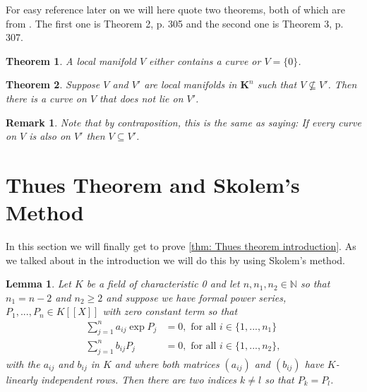 \documentclass{article}
\newtheorem{theorem}{Theorem}[section]
\newtheorem{lemma}{Lemma}[section]
\newtheorem{remark}{Remark}[section]
\newcommand{\mbb}[1]{\mathbb{#1}}
\numberwithin{equation}{section}
\begin{document}
%


For easy reference later on we will here quote two theorems, both of which are from \citep{borevich}. The first one is Theorem 2, p. 305 and the second one is Theorem 3, p. 307.

\begin{theorem}\label{thm: The shape of a manifold}
	A local manifold $V$ either contains a curve or $V = \{ 0 \}$.
\end{theorem}
\begin{theorem}\label{thm: One manifold is contained in another}
	Suppose $V$ and $V'$ are local manifolds in $\bm K^n$ such that $V \nsubseteq V'$. Then there is a curve on $V$ that does not lie on $V'$.
\end{theorem}
\begin{remark}\label{remark: One manifold is contained in another}
	Note that by contraposition, this is the same as saying: If every curve on $V$ is also on $V'$ then $V \subseteq V'$.
\end{remark}

\section{Thues Theorem and Skolem's Method}\label{section: skolem and thue}
In this section we will finally get to prove \cref{thm: Thues theorem introduction}. As we talked about in the introduction we will do this by using Skolem's method.

\begin{lemma} \label{lem: Two power series are equal}
	Let $K$ be a field of characteristic 0 and let $n,n_1,n_2 \in \mbb N$ so that $n_1 = n - 2$ and $n_2 \geq 2$ and suppose we have formal power series, $P_1, ..., P_n \in K[[X]]$ with zero constant term so that
	\begin{align*}
    	\sum_{j = 1}^n a_{ij} \exp P_j & = 0, \text{ for all } i \in \{1, ..., n_1\}  \\
    	\sum_{j = 1}^n b_{ij} P_j  	& = 0, \text{ for all } i \in \{1, ..., n_2\},
	\end{align*}
	with the $a_{ij}$ and $b_{ij}$ in $K$ and where both matrices $(a_{ij})$ and $(b_{ij})$ have $K$-linearly independent rows. Then there are two indices $k \neq l$ so that $P_k = P_l$.
\end{lemma}
\end{document}
